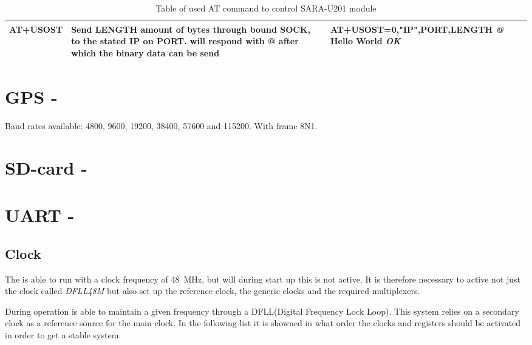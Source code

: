 \begin{table}
\begin{tabularx}{\textwidth}{p{2cm} X X}
		AT+USOST & Send LENGTH amount of bytes through bound SOCK, to the stated IP on PORT. \SARA will respond with @ after which the binary data can be send& AT+USOST=0,"IP",PORT,LENGTH \newline \newline
		\textit{@} \newline \newline
		Hello World \newline \newline
		\textit{OK} \\
		\bottomrule
	\end{tabularx}
	\caption{Table of used AT command to control SARA-U201 module}
	\label{tab:ATDesc}
\end{table}

\section{GPS - \GPS}
Baud rates available: \num{4800}, \num{9600}, \num{19200}, \num{38400}, \num{57600} and \num{115200}. With frame 8N1.

\cite{MKRSchem}

\section{SD-card - \SDsock}


\section{UART - \SAMD}

\subsection{Clock}
The \SAMD is able to run with a clock frequency of \SI{48}{\mega\hertz}, but will during start up this is not active. It is therefore necessary to active not just the clock called \textit{DFLL48M} but also set up the reference clock, the generic clocks and the required multiplexers.\newline


During operation \SAMD is able to maintain a given frequency through a DFLL(Digital Frequency Lock Loop). This system relies on a secondary clock as a reference source for the main clock. In the following list it is showned in what order the clocks and registers should be activated in order to get a stable system.

